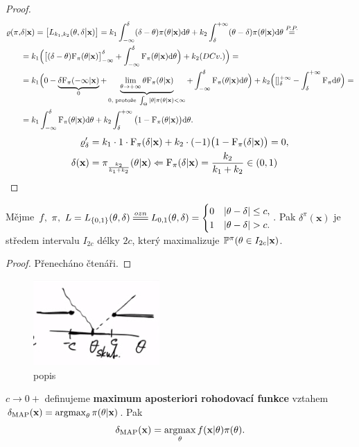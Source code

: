 \begin{theorem}
\begin{enumerate}[a:]
		\begin{proof}
			\[
			\begin{split}
			\varrho(\pi,&\delta|\textbf{x})=\big[L_{k_1,k_2}(\theta,\delta\big| \textbf{x})\big]=k_1\int_{-\infty}^\delta (\delta-\theta)\pi(\theta|\textbf{x})\mathrm{d}\theta+k_2\int_\delta^{+\infty}(\theta-\delta)\pi(\theta|\textbf{x})\mathrm{d}\theta\stackrel{P.P.}{=}\\&=k_1\Big(\big[(\delta-\theta)\mathrm{F}_\pi(\theta|\textbf{x})\big]_{-\infty}^\delta+\int_{-\infty}^\delta \mathrm{F}_\pi(\theta|\textbf{x})\mathrm{d}\theta\Big)+k_2(DCv.)\Big)=\\&=k_1\Big( 0-\underbrace{\delta\mathrm{F}_\pi(-\infty|\textbf{x})}_{0}+\underbrace{\lim\limits_{\theta\to+\infty}\theta\mathrm{F}_\pi(\theta|\textbf{x})}_{0\text{, protože }\int_\Theta |\theta|\pi(\theta|\textbf{x})<\infty}+\int_{-\infty}^\delta \mathrm{F}_\pi(\theta|\textbf{x})\mathrm{d}\theta \Big)+k_2\Big( []_\delta^{+\infty}-\int_\delta^{+\infty}\mathrm{F}_\pi \mathrm{d}\theta \Big)=\\&=k_1\int_{-\infty}^\delta \mathrm{F}_\pi(\theta|\textbf{x})\mathrm{d}\theta+k_2\int_\delta^{+\infty}\big(1-\mathrm{F}_\pi(\theta|\textbf{x})\big)\mathrm{d}\theta.
			\end{split}
			\]
			\[
			\begin{split}
			\varrho_\delta'&=k_1\cdot 1\cdot\mathrm{F}_\pi(\delta|\textbf{x})+k_2\cdot(-1)\big(1-\mathrm{F}_\pi(\delta|\textbf{x})\big)=0,\\\delta(\textbf{x})&=\pi_{\frac{k_2}{k_1+k_2}}(\theta|\textbf{x}) \Leftarrow \mathrm{F}_\pi(\delta|\textbf{x})=\frac{k_2}{k_1+k_2}\in(0,1)
			\end{split}
			\]
		\end{proof} 
	\end{enumerate}
	
\end{theorem}
\begin{theorem}
	Mějme $f,~\pi,~L=L_{\{0,1\}}(\t,\delta)\equal{ozn}L_{0,1}(\t,\delta)=\begin{cases}
	0&|\t-\delta|\leq c,\\1& |\t-\delta|>c.
	\end{cases}$. Pak $\delta^\pi(\textbf{x})$ je středem intervalu $I_{2c}$ délky $2c$, který maximalizuje $\mathbb{P}^\pi(\theta\in I_{2c}|\textbf{x})$.
	\begin{proof}
		Přenecháno čtenáři.
	\end{proof}
\begin{figure}[h]
	\centering
	\includegraphics[width=0.7\linewidth]{pictures/10.12-2}
	\caption{popis}
	\label{fig:105}
\end{figure}
\end{theorem}

\begin{define}
	$c\to 0+$ definujeme \textbf{maximum aposteriori rohodovací funkce} vztahem $\delta_\mathrm{MAP}(\textbf{x})=\mathop{\mathrm{argmax}}_\theta \pi(\theta|\textbf{x})$. Pak $$\delta_\mathrm{MAP}(\textbf{x})=\mathop{\mathrm{argmax}}_\theta f(\textbf{x}|\theta)\pi(\theta).$$
\end{define}



